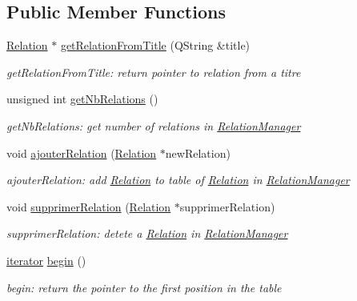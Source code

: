 \subsection*{Public Member Functions}
\begin{DoxyCompactItemize}
\item 
\hyperlink{class_relation}{Relation} $\ast$ \hyperlink{class_relation_manager_ab5eedc7d52a94e7377b532704366ee48}{get\+Relation\+From\+Title} (Q\+String \&title)
\begin{DoxyCompactList}\small\item\em get\+Relation\+From\+Title\+: return pointer to relation from a titre \end{DoxyCompactList}\item 
unsigned int \hyperlink{class_relation_manager_ac4f3ef3f86fd911fb6619de910a52411}{get\+Nb\+Relations} ()
\begin{DoxyCompactList}\small\item\em get\+Nb\+Relations\+: get number of relations in \hyperlink{class_relation_manager}{Relation\+Manager} \end{DoxyCompactList}\item 
void \hyperlink{class_relation_manager_a6661d400acae8992ce2d0677f7bb8bb7}{ajouter\+Relation} (\hyperlink{class_relation}{Relation} $\ast$new\+Relation)
\begin{DoxyCompactList}\small\item\em ajouter\+Relation\+: add \hyperlink{class_relation}{Relation} to table of \hyperlink{class_relation}{Relation} in \hyperlink{class_relation_manager}{Relation\+Manager} \end{DoxyCompactList}\item 
void \hyperlink{class_relation_manager_a1ab185cfa12b8632d44c7f705d0168f1}{supprimer\+Relation} (\hyperlink{class_relation}{Relation} $\ast$supprimer\+Relation)
\begin{DoxyCompactList}\small\item\em supprimer\+Relation\+: detete a \hyperlink{class_relation}{Relation} in \hyperlink{class_relation_manager}{Relation\+Manager} \end{DoxyCompactList}\item 
\hyperlink{class_relation_manager_1_1iterator}{iterator} \hyperlink{class_relation_manager_a0cbea7cf6799fb13153d1fab8b345487}{begin} ()
\begin{DoxyCompactList}\small\item\em begin\+: return the pointer to the first position in the table \end{DoxyCompactList}\item 

\end{DoxyCompactItemize}
